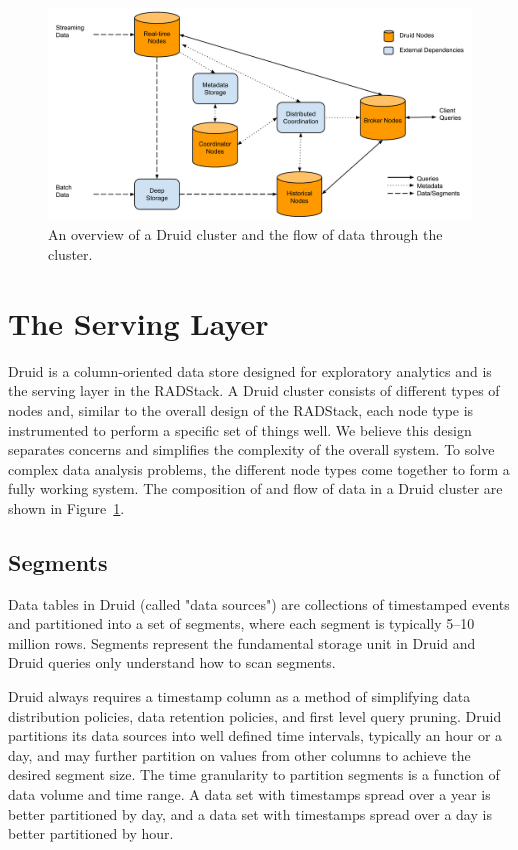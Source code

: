 \documentclass{vldb}
\begin{document}
{\begin{figure}
\centering
\includegraphics[width = 4.5in]{cluster}
\caption{An overview of a Druid cluster and the flow of data through the cluster.}
\label{fig:cluster}
\end{figure}

\section{The Serving Layer}
\label{sec:serving}
Druid is a column-oriented data store designed for exploratory analytics and is
the serving layer in the RADStack. A Druid cluster consists of different types
of nodes and, similar to the overall design of the RADStack, each node type is
instrumented to perform a specific set of things well. We believe this design
separates concerns and simplifies the complexity of the overall system. To
solve complex data analysis problems, the different node types come together to
form a fully working system. The composition of and flow of data in a Druid
cluster are shown in Figure~\ref{fig:cluster}.

\subsection{Segments}
\label{sec:segments}
Data tables in Druid (called "data sources") are collections of timestamped
events and partitioned into a set of segments, where each segment is typically
5–10 million rows. Segments represent the fundamental storage unit in
Druid and Druid queries only understand how to scan segments. 

Druid always requires a timestamp column as a method of simplifying data
distribution policies, data retention policies, and first level query pruning.
Druid partitions its data sources into well defined time intervals, typically
an hour or a day, and may further partition on values from other columns to
achieve the desired segment size. The time granularity to partition segments is
a function of data volume and time range. A data set with timestamps spread
over a year is better partitioned by day, and a data set with timestamps spread
over a day is better partitioned by hour. 

}
\end{document}
